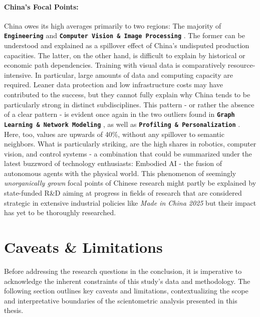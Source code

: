 \documentclass{article}
\begin{document}
	\paragraph{China's Focal Points:} China owes its high averages primarily to two regions: The majority of \textbf{\texttt{Engineering}}  and \textbf{\texttt{Computer Vision \& Image Processing}} . The former can be understood and explained as a spillover effect of China's undisputed production capacities. The latter, on the other hand, is difficult to explain by historical or economic path dependencies. Training with visual data is comparatively resource-intensive. In particular, large amounts of data and computing capacity are required. Leaner data protection and low infrastructure costs may have contributed to the success, but they cannot fully explain why China tends to be particularly strong in distinct subdisciplines. This pattern - or rather the absence of a clear pattern - is evident once again in the two outliers found in \textbf{\texttt{Graph Learning \& Network Modeling}} , as well as \textbf{\texttt{Profiling \& Personalization}} . Here, too, values are upwards of 40\%, without any spillover to semantic neighbors. What is particularly striking, are the high shares in robotics, computer vision, and control systems - a combination that could be summarized under the latest buzzword of technology enthusiasts: Embodied AI - the fusion of autonomous agents with the physical world. This phenomenon of seemingly \textit{unorganically grown} focal points of Chinese research might partly be explained by state-funded R\&D aiming at progress in fields of research that are considered strategic in extensive industrial policies like \textit{Made in China 2025} but their impact has yet to be thoroughly researched.
	
	
	\section{Caveats \& Limitations}
	\label{conclusion_limitations}
	
	Before addressing the research questions in the conclusion, it is imperative to acknowledge the inherent constraints of this study's data and methodology. The following section outlines key caveats and limitations, contextualizing the scope and interpretative boundaries of the scientometric analysis presented in this thesis.
	
\end{document}
